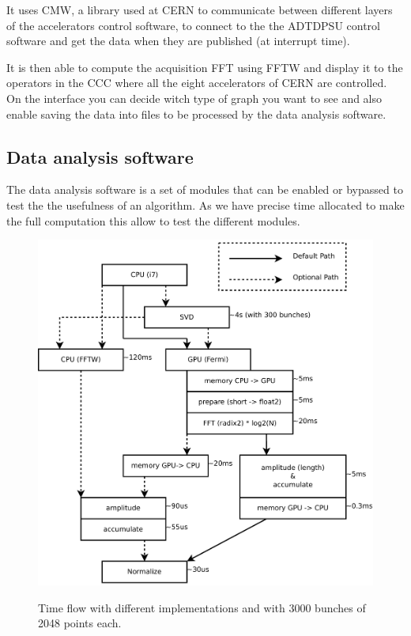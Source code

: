 	It uses \gls{CMW}, a library used at \gls{CERN} to communicate between different layers of the accelerators control software, to connect to the the ADTDPSU control software and get the data when they are published (at interrupt time).

	It is then able to compute the acquisition \gls{FFT} using \gls{FFTW} and display it to the operators in the \gls{CCC} where all the eight accelerators of \gls{CERN} are controlled. On the interface you can decide witch type of graph you want to see and also enable saving the data into files to be processed by the data analysis software.

	\subsection{Data analysis software}
	\label{sec:data_analysis_software}

	The data analysis software is a set of modules that can be enabled or bypassed to test the the usefulness of an algorithm. As we have precise time allocated to make the full computation this allow to test the different modules.

	\begin{figure}[H]
	\caption{Time flow with different implementations and with 3000 bunches of 
	2048 points each.}
	\centering
	\includegraphics[scale=0.3]{PC-flow.pdf}
	\label{fig:PCFlow}
	\end{figure}


